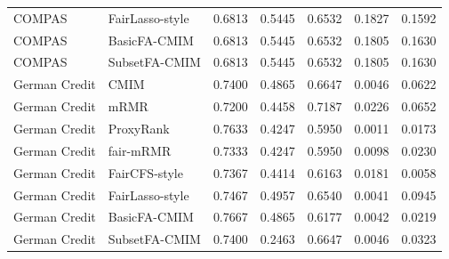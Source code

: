 \begin{table}[htbp]
{\begin{tabular}{lllllll}
COMPAS & FairLasso-style & 0.6813 & 0.5445 & 0.6532 & 0.1827 & 0.1592 \\
COMPAS & BasicFA-CMIM & 0.6813 & 0.5445 & 0.6532 & 0.1805 & 0.1630 \\
COMPAS & SubsetFA-CMIM & 0.6813 & 0.5445 & 0.6532 & 0.1805 & 0.1630 \\
German Credit & CMIM & 0.7400 & 0.4865 & 0.6647 & 0.0046 & 0.0622 \\
German Credit & mRMR & 0.7200 & 0.4458 & 0.7187 & 0.0226 & 0.0652 \\
German Credit & ProxyRank & 0.7633 & 0.4247 & 0.5950 & 0.0011 & 0.0173 \\
German Credit & fair-mRMR & 0.7333 & 0.4247 & 0.5950 & 0.0098 & 0.0230 \\
German Credit & FairCFS-style & 0.7367 & 0.4414 & 0.6163 & 0.0181 & 0.0058 \\
German Credit & FairLasso-style & 0.7467 & 0.4957 & 0.6540 & 0.0041 & 0.0945 \\
German Credit & BasicFA-CMIM & 0.7667 & 0.4865 & 0.6177 & 0.0042 & 0.0219 \\
German Credit & SubsetFA-CMIM & 0.7400 & 0.2463 & 0.6647 & 0.0046 & 0.0323 \\
\bottomrule
\end{tabular}
}
\end{table}
